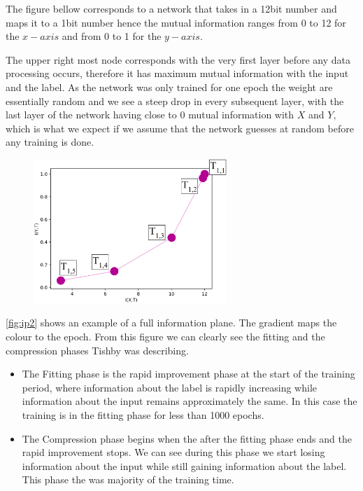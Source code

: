 \documentclass[dissertation.tex]{subfiles}
\begin{document}
The figure bellow corresponds to a network that takes in a 12bit number and maps
it to a 1bit number hence the mutual information ranges from 0 to 12 for the $
x-axis $ and from 0 to 1 for the $ y-axis $.

The upper right most node corresponds with the very first layer before any data
processing occurs, therefore it has maximum mutual information with the input
and the label. As the network was only trained for one epoch the weight are
essentially random and we see a steep drop in every subsequent layer, with the
last layer of the network having close to 0 mutual information with $ X $ and $
Y $, which is what we expect if we assume that the network guesses at random
before any training is done.

\begin{figure}[H]
  \centering
  \includegraphics[width=0.65\textwidth]{figs/ip_1v3.png}
  \label{fig:ip2}
\end{figure}

\autoref{fig:ip2} shows an example of a full information plane. The gradient
maps the colour to the epoch. From this figure we can clearly see the fitting
and the compression phases Tishby was describing. 

\begin{itemize}
  \item{
      The Fitting phase is the rapid improvement phase at the start of the
      training period, where information about the label is rapidly increasing
      while information about the input remains approximately the same. In this
      case the training is in the fitting phase for less than 1000 epochs.
    }
  \item{
      The Compression phase begins when the after the fitting phase ends and the
      rapid improvement stops. We can see during this phase we start losing
      information about the input while still gaining information about the
      label. This phase the was majority of the training time.
    }
\end{itemize}
\end{document}
